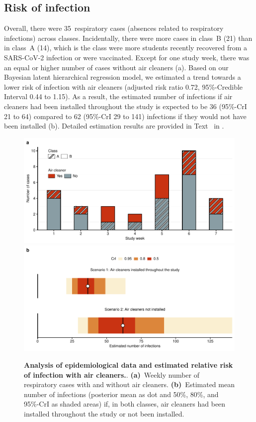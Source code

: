 \documentclass[fleqn,11pt]{wlscirep}
\begin{document}
\subsection{Risk of infection}

Overall, there were 35~respiratory cases (absences related to respiratory infections) across classes. Incidentally, there were more cases in class~B (21) than in class~A (14), which is the class were more students recently recovered from a SARS-CoV-2 infection or were vaccinated. Except for one study week, there was an equal or higher number of cases without air cleaners (a). Based on our Bayesian latent hierarchical regression model, we estimated a trend towards a lower risk of infection with air cleaners (adjusted risk ratio 0.72, 95\%-Credible Interval 0.44 to 1.15). As a result, the estimated number of infections if air cleaners had been installed throughout the study is expected to be 36 (95\%-CrI 21 to 64) compared to 62 (95\%-CrI 29 to 141) infections if they would not have been installed (b). Detailed estimation results are provided in Text~ in \supp. 

\begin{figure}[!htpb]
    \includegraphics[width=\linewidth]{../../results/epi-data/cases_by_week.pdf} 
    \includegraphics[width=\linewidth]{../../results/epi-data/avoided-infections.pdf}
    \caption{\textbf{Analysis of epidemiological data and estimated relative risk of infection with air cleaners.}. \textbf{(a)}~Weekly number of respiratory cases with and without air cleaners. \textbf{(b)}~Estimated mean number of infections (posterior mean as dot and 50\%, 80\%, and 95\%-CrI as shaded areas) if, in both classes, air cleaners had been installed throughout the study or not been installed.}
    \label{fig:redcap-results}
\end{figure}
\end{document}
